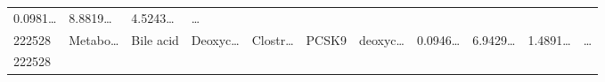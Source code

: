 \documentclass[
]{article}
\begin{document}
\begin{longtable}[]{@{}lllllllllll@{}}
\begin{minipage}[t]{0.07\columnwidth}
0.0981\ldots{}\strut
\end{minipage} & \begin{minipage}[t]{0.07\columnwidth}\raggedright
8.8819\ldots{}\strut
\end{minipage} & \begin{minipage}[t]{0.07\columnwidth}\raggedright
4.5243\ldots{}\strut
\end{minipage} & \begin{minipage}[t]{0.03\columnwidth}\raggedright
\ldots{}\strut
\end{minipage}\tabularnewline
\begin{minipage}[t]{0.05\columnwidth}\raggedright
222528\strut
\end{minipage} & \begin{minipage}[t]{0.07\columnwidth}\raggedright
Metabo\ldots{}\strut
\end{minipage} & \begin{minipage}[t]{0.07\columnwidth}\raggedright
Bile acid\strut
\end{minipage} & \begin{minipage}[t]{0.09\columnwidth}\raggedright
Deoxyc\ldots{}\strut
\end{minipage} & \begin{minipage}[t]{0.07\columnwidth}\raggedright
Clostr\ldots{}\strut
\end{minipage} & \begin{minipage}[t]{0.07\columnwidth}\raggedright
PCSK9\strut
\end{minipage} & \begin{minipage}[t]{0.09\columnwidth}\raggedright
deoxyc\ldots{}\strut
\end{minipage} & \begin{minipage}[t]{0.07\columnwidth}\raggedright
0.0946\ldots{}\strut
\end{minipage} & \begin{minipage}[t]{0.07\columnwidth}\raggedright
6.9429\ldots{}\strut
\end{minipage} & \begin{minipage}[t]{0.07\columnwidth}\raggedright
1.4891\ldots{}\strut
\end{minipage} & \begin{minipage}[t]{0.03\columnwidth}\raggedright
\ldots{}\strut
\end{minipage}\tabularnewline
\begin{minipage}[t]{0.05\columnwidth}\raggedright
222528\strut
\end{minipage} & \begin{minipage}[t]{0.07\columnwidth}\raggedright

\end{minipage}
\end{longtable}
\end{document}
